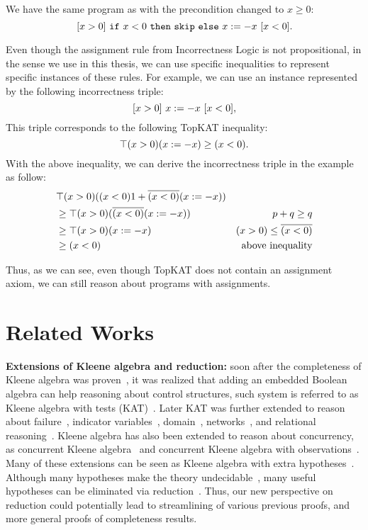 \begin{example}[Assignment]
    We have the same program as 
    with the precondition changed to \(x \geq 0\):
    \[[x > 0]~\mathtt{if}~x < 0~\mathtt{then}~\mathtt{skip}~\mathtt{else}~x:= -x~[x < 0].\]

    Even though the assignment rule from Incorrectness Logic is not propositional, 
    in the sense we use in this thesis,  
    we can use specific inequalities to represent specific instances of these rules. 
    For example, we can use an instance represented by the following incorrectness triple:
\[[x > 0]~x:= -x~[x < 0],\]
This triple corresponds to the following TopKAT inequality:
\[\top (x > 0) (x:= -x) \geq (x < 0).\]
With the above inequality, we can derive the incorrectness triple in the example as follow:
\begin{align*}
    & \top (x > 0) ((x < 0) 1 + \overline{(x < 0)} (x:= -x)) \\
    & \geq \top (x > 0) (\overline{(x < 0)} (x:= -x)) 
        & p + q \geq q\\
    & \geq \top (x > 0) (x:= -x) 
        & (x > 0) \leq \overline{(x < 0)}\\
    & \geq (x < 0) 
        & \text{above inequality}
\end{align*}
\end{example}

Thus, as we can see, even though TopKAT does not contain an assignment axiom,
we can still reason about programs with assignments.

\section{Related Works}

\textbf{Extensions of Kleene algebra and reduction:}
soon after the completeness of Kleene algebra was proven~\cite{Kozen_1994},
it was realized that adding an embedded Boolean algebra can help reasoning
about control structures, such system is referred to as
Kleene algebra with tests (KAT)~\cite{Kozen_Smith_1997,Cohen_Kozen_Smith_1999}.
Later KAT was further extended to reason about failure~\cite{Mamouras_2017},
indicator variables~\cite{Grathwohl_Kozen_Mamouras_2014},
domain~\cite{Desharnais_Möller_Struth_2006}, networks~\cite{Anderson_Foster_Guha_Jeannin_Kozen_Schlesinger_Walker_2014},
and relational reasoning~\cite{Antonopoulos_Koskinen_Le_Nagasamudram_Naumann_Ngo_2022}.
Kleene algebra has also been extended to reason about 
concurrency, as concurrent Kleene algebra~\cite{Hoare_van_Staden_Möller_Struth_Zhu_2016, Kappé_Brunet_Silva_Zanasi_2018}
and concurrent Kleene algebra with observations~\cite{Kappé_Brunet_Silva_Wagemaker_Zanasi_2020}.
Many of these extensions can be seen as Kleene algebra with extra hypotheses~\cite{Cohen_1995,Doumane_Kuperberg_Pous_Pradic_2019}.
Although many hypotheses make the theory undecidable~\cite{Kozen_1996,Kozen_2002,Doumane_Kuperberg_Pous_Pradic_2019},
many useful hypotheses can be eliminated via reduction~\cite{Pous_Rot_Wagemaker_2021}.
Thus, our new perspective on reduction could potentially lead to streamlining of various previous proofs, 
and more general proofs of completeness results.

